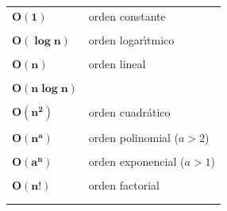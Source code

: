 \documentclass[twoside]{report}
\newcommand{\bs}[1]{\boldsymbol{#1}}
\begin{document}
        \begin{tabular}{ll}
              \vspace{-0.2cm}
            $\bs{O(1)}$ & orden constante \\ \\
              \vspace{-0.2cm}
            $\bs{O(\log n)}$ & orden logar\'{\i}tmico \\ \\
              \vspace{-0.2cm}
            $\bs{O(n)}$ & orden lineal \\ \\
              \vspace{-0.2cm}
            $\bs{O(n\log n)}$ &  \\ \\
              \vspace{-0.2cm}
            $\bs{O(n^2)}$ & orden cuadr\'{a}tico \\ \\
              \vspace{-0.2cm}
            $\bs{O(n^a)}$ & orden polinomial ($a>2$) \\ \\
              \vspace{-0.2cm}
            $\bs{O(a^n)}$ & orden exponencial ($a>1$) \\ \\
              \vspace{-0.2cm}
            $\bs{O(n!)}$ & orden factorial \\ \\
              \vspace{-0.2cm}
        \end{tabular}
\end{document}
